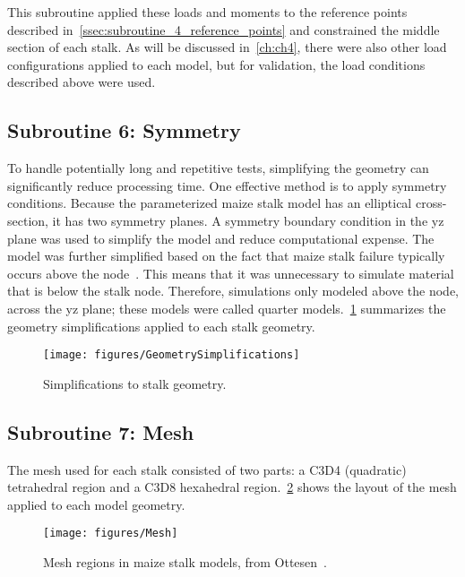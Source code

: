 This subroutine applied these loads and moments to the reference points described in~\cref{ssec:subroutine_4_reference_points} and constrained the middle section of each stalk. As will be discussed in~\cref{ch:ch4}, there were also other load configurations applied to each model, but for validation, the load conditions described above were used.

\subsection{Subroutine 6: Symmetry}
\label{ssec:subroutine_6_symmetry}
To handle potentially long and repetitive tests, simplifying the geometry can significantly reduce processing time. One effective method is to apply symmetry conditions. Because the parameterized maize stalk model has an elliptical cross-section, it has two symmetry planes. A symmetry boundary condition in the yz plane was used to simplify the model and reduce computational expense. The model was further simplified based on the fact that maize stalk failure typically occurs above the node~. This means that it was unnecessary to simulate material that is below the stalk node. Therefore, simulations only modeled above the node, across the yz plane; these models were called quarter models.~\cref{fig:GeometrySimplifications} summarizes the geometry simplifications applied to each stalk geometry.
\newline
\newline

\begin{figure}[htbp]
	\centering
	\texttt{[image: figures/GeometrySimplifications]}
	\caption[Simplifications to stalk geometry.]{Simplifications to stalk geometry.}
	\label{fig:GeometrySimplifications}
\end{figure}

\subsection{Subroutine 7: Mesh}
\label{ssec:subroutine_7_mesh}
The mesh used for each stalk consisted of two parts: a C3D4 (quadratic) tetrahedral region and a C3D8 hexahedral region.~\cref{fig:Mesh} shows the layout of the mesh applied to each model geometry. 
\newline

\begin{figure}[htbp]
	\centering
	\texttt{[image: figures/Mesh]}
	\caption[Mesh regions in maize stalk models.]{Mesh regions in maize stalk models, from Ottesen~\protect\cite{ottesen_development_2023-1}.}
	\label{fig:Mesh}
\end{figure}

